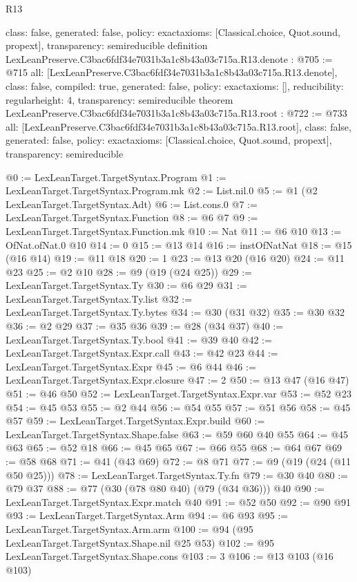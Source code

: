\begin{lexlean}{R13}
\begin{coremodule}
{  class: false,
  generated: false,
  policy: exact{axioms: [Classical.choice, Quot.sound, propext]},
  transparency: semireducible
}
definition LexLeanPreserve.C3bac6fdf34e7031b3a1c8b43a03c715a.R13.denote : @705 := @715 {
  all: [LexLeanPreserve.C3bac6fdf34e7031b3a1c8b43a03c715a.R13.denote],
  class: false,
  compiled: true,
  generated: false,
  policy: exact{axioms: []},
  reducibility: regular{height: 4},
  transparency: semireducible
}
theorem LexLeanPreserve.C3bac6fdf34e7031b3a1c8b43a03c715a.R13.root : @722 := @733 {
  all: [LexLeanPreserve.C3bac6fdf34e7031b3a1c8b43a03c715a.R13.root],
  class: false,
  generated: false,
  policy: exact{axioms: [Classical.choice, Quot.sound, propext]},
  transparency: semireducible
}

@0 := LexLeanTarget.TargetSyntax.Program
@1 := LexLeanTarget.TargetSyntax.Program.mk
@2 := List.nil.{0}
@5 := @1 (@2 LexLeanTarget.TargetSyntax.Adt)
@6 := List.cons.{0}
@7 := LexLeanTarget.TargetSyntax.Function
@8 := @6 @7
@9 := LexLeanTarget.TargetSyntax.Function.mk
@10 := Nat
@11 := @6 @10
@13 := OfNat.ofNat.{0} @10
@14 := 0
@15 := @13 @14
@16 := instOfNatNat
@18 := @15 (@16 @14)
@19 := @11 @18
@20 := 1
@23 := @13 @20 (@16 @20)
@24 := @11 @23
@25 := @2 @10
@28 := @9 (@19 (@24 @25))
@29 := LexLeanTarget.TargetSyntax.Ty
@30 := @6 @29
@31 := LexLeanTarget.TargetSyntax.Ty.list
@32 := LexLeanTarget.TargetSyntax.Ty.bytes
@34 := @30 (@31 @32)
@35 := @30 @32
@36 := @2 @29
@37 := @35 @36
@39 := @28 (@34 @37)
@40 := LexLeanTarget.TargetSyntax.Ty.bool
@41 := @39 @40
@42 := LexLeanTarget.TargetSyntax.Expr.call
@43 := @42 @23
@44 := LexLeanTarget.TargetSyntax.Expr
@45 := @6 @44
@46 := LexLeanTarget.TargetSyntax.Expr.closure
@47 := 2
@50 := @13 @47 (@16 @47)
@51 := @46 @50
@52 := LexLeanTarget.TargetSyntax.Expr.var
@53 := @52 @23
@54 := @45 @53
@55 := @2 @44
@56 := @54 @55
@57 := @51 @56
@58 := @45 @57
@59 := LexLeanTarget.TargetSyntax.Expr.build
@60 := LexLeanTarget.TargetSyntax.Shape.false
@63 := @59 @60 @40 @55
@64 := @45 @63
@65 := @52 @18
@66 := @45 @65
@67 := @66 @55
@68 := @64 @67
@69 := @58 @68
@71 := @41 (@43 @69)
@72 := @8 @71
@77 := @9 (@19 (@24 (@11 @50 @25)))
@78 := LexLeanTarget.TargetSyntax.Ty.fn
@79 := @30 @40
@80 := @79 @37
@88 := @77 (@30 (@78 @80 @40) (@79 (@34 @36))) @40
@90 := LexLeanTarget.TargetSyntax.Expr.match @40
@91 := @52 @50
@92 := @90 @91
@93 := LexLeanTarget.TargetSyntax.Arm
@94 := @6 @93
@95 := LexLeanTarget.TargetSyntax.Arm.arm
@100 := @94 (@95 LexLeanTarget.TargetSyntax.Shape.nil @25 @53)
@102 := @95 LexLeanTarget.TargetSyntax.Shape.cons
@103 := 3
@106 := @13 @103 (@16 @103)

\end{coremodule}
\end{lexlean}
